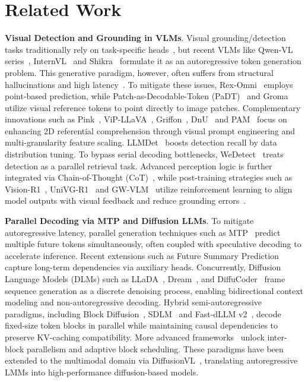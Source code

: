 \section{Related Work} \label{sec:related}

\textbf{Visual Detection and Grounding in VLMs}. Visual grounding/detection tasks traditionally rely on task-specific heads~\citep{carion2020end, liu2024grounding, ren2016faster, jiang2024far3d}, but recent VLMs like Qwen-VL series~\citep{bai2025qwen2.5vl, bai2025qwen3vltechnicalreport}, InternVL~\citep{chen2024internvl} and Shikra~\citep{chen2023shikra} formulate it as an autoregressive token generation problem. This generative paradigm, however, often suffers from structural hallucinations and high latency~\citep{li2023evaluating}. To mitigate these issues, Rex-Omni~\citep{jiang2025rexomni} employs point-based prediction, while Patch-as-Decodable-Token (PaDT)~\citep{su2026patch} and Groma~\citep{ma2024groma} utilize visual reference tokens to point directly to image patches. Complementary innovations such as Pink~\citep{xuan2024pink}, ViP-LLaVA~\citep{cai2024vipllava}, Griffon~\citep{zhan2024griffon},  DnU~\citep{lin2024draw} and PAM~\citep{lin2025perceive} focus on enhancing 2D referential comprehension through visual prompt engineering and multi-granularity feature scaling.
LLMDet~\citep{fu2025llmdet} boosts detection recall by data distribution tuning. To bypass serial decoding bottlenecks, WeDetect~\citep{fu2025wedetect} treats detection as a parallel retrieval task. Advanced perception logic is further integrated via Chain-of-Thought (CoT)~\citep{qi2025cot4det}, while post-training strategies such as Vision-R1~\citep{zhan2025visionr1}, UniVG-R1~\citep{bai2025univg} and GW-VLM~\citep{jiang2026gwvlm} utilize reinforcement learning to align model outputs with visual feedback and reduce grounding errors~\citep{zhang2024ferretv2}.

\noindent\textbf{Parallel Decoding via MTP and Diffusion LLMs}.
To mitigate autoregressive latency, parallel generation techniques such as MTP~\citep{gloeckle2024better, cai2024medusa, samragh2025your} predict multiple future tokens simultaneously, often coupled with speculative decoding to accelerate inference. Recent extensions such as Future Summary Prediction~\citep{mahajan2025beyond} capture long-term dependencies via auxiliary heads. Concurrently, Diffusion Language Models (DLMs) such as LLaDA~\citep{nie2025large}, Dream~\citep{ye2025dream}, and DiffuCoder~\citep{gong2025diffucoder} frame sequence generation as a discrete denoising process, enabling bidirectional context modeling and non-autoregressive decoding. Hybrid semi-autoregressive paradigms, including Block Diffusion~\citep{arriola2025block}, SDLM~\citep{liu2025sequential} and Fast-dLLM v2~\citep{wu2025fast}, decode fixed-size token blocks in parallel while maintaining causal dependencies to preserve KV-caching compatibility. More advanced frameworks~\citep{wang2025diffusion, lu2025adablock} unlock inter-block parallelism and adaptive block scheduling. These paradigms have been extended to the multimodal domain via DiffusionVL~\citep{li2025diffusionvl}, translating autoregressive LMMs into high-performance diffusion-based models.


